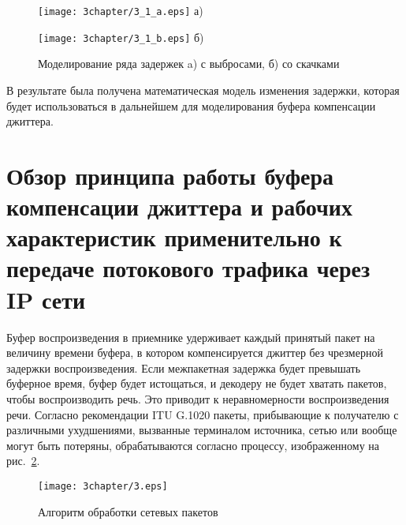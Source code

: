 \begin{figure} [h]
\begin{minipage}[h]{0.47\linewidth}
\center
\texttt{[image: 3chapter/3\_1\_a.eps]} а) \\
\end{minipage}
\hfill
\begin{minipage}[h]{0.47\linewidth}
\center
\texttt{[image: 3chapter/3\_1\_b.eps]} б) \\
\end{minipage}
\caption{Моделирование ряда задержек a) с выбросами, б) со скачками}
\label{img3:modelJitter}
\end{figure}

В результате была получена математическая модель изменения задержки, которая будет использоваться в дальнейшем для моделирования буфера компенсации джиттера.

\section{Обзор принципа работы буфера компенсации джиттера и рабочих характеристик применительно к передаче потокового трафика через IP сети} \label{sect3_2}

Буфер воспроизведения в приемнике удерживает каждый принятый пакет на величину времени буфера, в котором компенсируется джиттер без чрезмерной задержки воспроизведения. Если межпакетная задержка будет превышать буферное время, буфер будет истощаться, и декодеру не будет хватать пакетов, чтобы воспроизводить речь. Это приводит к неравномерности воспроизведения речи. 
Согласно рекомендации ITU G.1020 \cite{G1020} пакеты, прибывающие к получателю с различными ухудшениями, вызванные терминалом источника, сетью или вообще могут быть потеряны, обрабатываются согласно процессу, изображенному на рис. \ref{img3:algh_pack}.

\begin{figure} [h]
  \center
\texttt{[image: 3chapter/3.eps]}
  \caption{Алгоритм обработки сетевых пакетов}
  \label{img3:algh_pack}
\end{figure}

